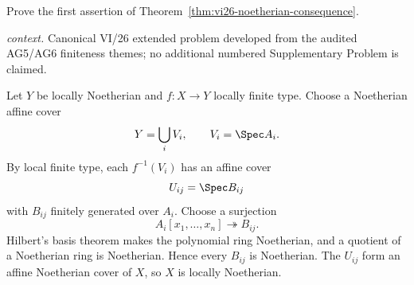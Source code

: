 \begin{problem}\label{prob:vi26-p13}
Prove the first assertion of Theorem~\ref{thm:vi26-noetherian-consequence}.
\par\smallskip\noindent\textit{context.} Canonical VI/26 extended problem developed from the audited AG5/AG6 finiteness themes; no additional numbered Supplementary Problem is claimed.
\end{problem}

\ifdefined\FullProblemDossiers
\begin{solution}
Let \(Y\) be locally Noetherian and \(f:X\to Y\) locally finite type.  Choose a Noetherian affine
cover
\[
Y=\bigcup_iV_i,\qquad V_i=\Spec A_i.
\]
By local finite type, each \(f^{-1}(V_i)\) has an affine cover
\[
U_{ij}=\Spec B_{ij}
\]
with \(B_{ij}\) finitely generated over \(A_i\).  Choose a surjection
\[
A_i[x_1,\ldots,x_n]\twoheadrightarrow B_{ij}.
\]
Hilbert's basis theorem makes the polynomial ring Noetherian, and a quotient of a Noetherian ring is
Noetherian.  Hence every \(B_{ij}\) is Noetherian.  The \(U_{ij}\) form an affine Noetherian cover
of \(X\), so \(X\) is locally Noetherian.
\end{solution}
\fi
